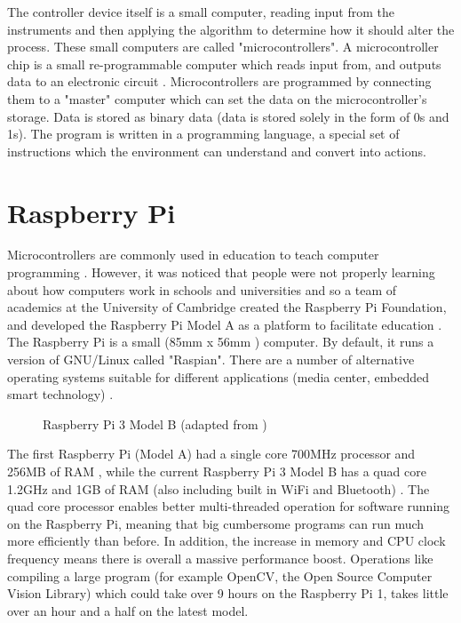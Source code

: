 \documentclass[twoside,a4]{report}
\def\br{\newline \newline \noindent}
\begin{document}
	The controller device itself is a small computer, reading input from the instruments and then applying the algorithm to determine how it should alter the process. These small computers are called "microcontrollers". A microcontroller chip is a small re-programmable computer which reads input from, and outputs data to an electronic circuit \cite{backwhatismc}. Microcontrollers are programmed by connecting them to a "master" computer which can set the data on the microcontroller's storage. Data is stored as binary data (data is stored solely in the form of 0s and 1s). The program is written in a programming language, a special set of instructions which the environment can understand and convert into actions. \br
	
	\section{Raspberry Pi} %
	\noindent
	Microcontrollers are commonly used in education to teach computer programming \cite{backmcedu1, backmcedu2}. However, it was noticed that people were not properly learning about how computers work in schools and universities and so a team of academics at the University of Cambridge created the Raspberry Pi Foundation, and developed the Raspberry Pi Model A as a platform to facilitate education \cite{pihistory}. The Raspberry Pi is a small (85mm x 56mm \cite{pi3mechdraw}) computer. By default, it runs a version of GNU/Linux called "Raspian". There are a number of alternative operating systems suitable for different applications (media center, embedded smart technology) \cite{piotheros}.  \newline
	\begin{figure}[!htb]
		\centering
		\caption{Raspberry Pi 3 Model B (adapted from  \cite{pi3info})}
		\label{pidia}
	\end{figure} \newline%
	The first Raspberry Pi (Model A) had a single core 700MHz processor and 256MB of RAM \cite{pi1info}, while the current Raspberry Pi 3 Model B has a quad core 1.2GHz and 1GB of RAM (also including built in WiFi and Bluetooth) \cite{pi3info}. The quad core processor enables better multi-threaded operation for software running on the Raspberry Pi, meaning that big cumbersome programs can run much more efficiently than before. In addition, the increase in memory and CPU clock frequency means there is overall a massive performance boost. Operations like compiling a large program (for example OpenCV, the Open Source Computer Vision Library) which could take over 9 hours \cite{pipowercompold} on the Raspberry Pi 1, takes little over an hour and a half \cite{pipowercompnew} on the latest model.\br
\end{document}
